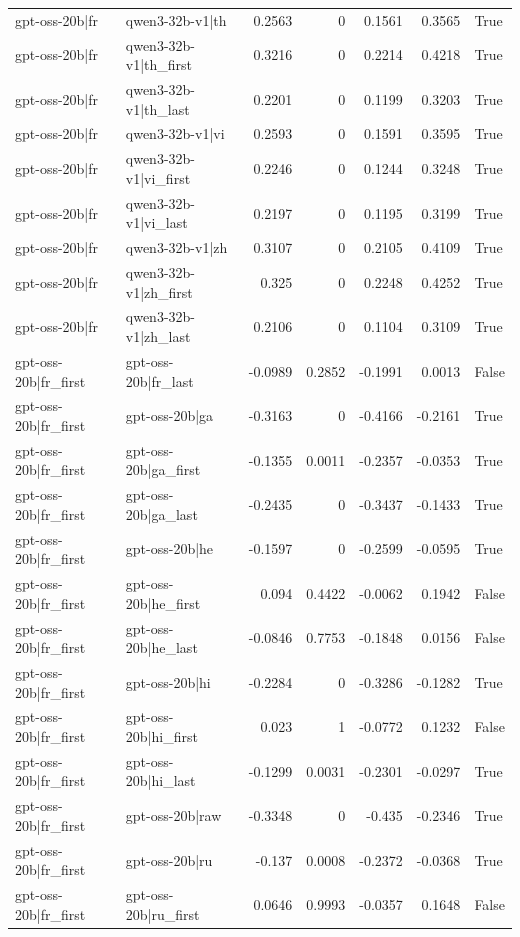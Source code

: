 \begin{table}
\begin{tabular}{l l r r r r l}
gpt-oss-20b|fr & qwen3-32b-v1|th & 0.2563 & 0 & 0.1561 & 0.3565 & True \\
gpt-oss-20b|fr & qwen3-32b-v1|th_first & 0.3216 & 0 & 0.2214 & 0.4218 & True \\
gpt-oss-20b|fr & qwen3-32b-v1|th_last & 0.2201 & 0 & 0.1199 & 0.3203 & True \\
gpt-oss-20b|fr & qwen3-32b-v1|vi & 0.2593 & 0 & 0.1591 & 0.3595 & True \\
gpt-oss-20b|fr & qwen3-32b-v1|vi_first & 0.2246 & 0 & 0.1244 & 0.3248 & True \\
gpt-oss-20b|fr & qwen3-32b-v1|vi_last & 0.2197 & 0 & 0.1195 & 0.3199 & True \\
gpt-oss-20b|fr & qwen3-32b-v1|zh & 0.3107 & 0 & 0.2105 & 0.4109 & True \\
gpt-oss-20b|fr & qwen3-32b-v1|zh_first & 0.325 & 0 & 0.2248 & 0.4252 & True \\
gpt-oss-20b|fr & qwen3-32b-v1|zh_last & 0.2106 & 0 & 0.1104 & 0.3109 & True \\
gpt-oss-20b|fr_first & gpt-oss-20b|fr_last & -0.0989 & 0.2852 & -0.1991 & 0.0013 & False \\
gpt-oss-20b|fr_first & gpt-oss-20b|ga & -0.3163 & 0 & -0.4166 & -0.2161 & True \\
gpt-oss-20b|fr_first & gpt-oss-20b|ga_first & -0.1355 & 0.0011 & -0.2357 & -0.0353 & True \\
gpt-oss-20b|fr_first & gpt-oss-20b|ga_last & -0.2435 & 0 & -0.3437 & -0.1433 & True \\
gpt-oss-20b|fr_first & gpt-oss-20b|he & -0.1597 & 0 & -0.2599 & -0.0595 & True \\
gpt-oss-20b|fr_first & gpt-oss-20b|he_first & 0.094 & 0.4422 & -0.0062 & 0.1942 & False \\
gpt-oss-20b|fr_first & gpt-oss-20b|he_last & -0.0846 & 0.7753 & -0.1848 & 0.0156 & False \\
gpt-oss-20b|fr_first & gpt-oss-20b|hi & -0.2284 & 0 & -0.3286 & -0.1282 & True \\
gpt-oss-20b|fr_first & gpt-oss-20b|hi_first & 0.023 & 1 & -0.0772 & 0.1232 & False \\
gpt-oss-20b|fr_first & gpt-oss-20b|hi_last & -0.1299 & 0.0031 & -0.2301 & -0.0297 & True \\
gpt-oss-20b|fr_first & gpt-oss-20b|raw & -0.3348 & 0 & -0.435 & -0.2346 & True \\
gpt-oss-20b|fr_first & gpt-oss-20b|ru & -0.137 & 0.0008 & -0.2372 & -0.0368 & True \\
gpt-oss-20b|fr_first & gpt-oss-20b|ru_first & 0.0646 & 0.9993 & -0.0357 & 0.1648 & False \\

\end{tabular}
\end{table}
